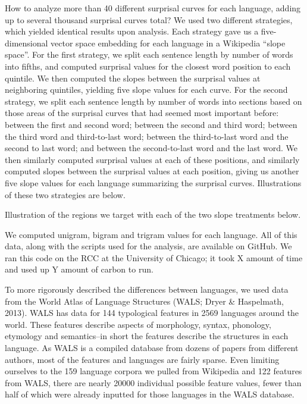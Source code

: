 \documentclass[11pt,]{article}
\begin{document}
How to analyze more than 40 different surprisal curves for each language, adding up to several thousand surprisal curves total? We used two different strategies, which yielded identical results upon analysis. Each strategy gave us a five-dimensional vector space embedding for each language in a Wikipedia ``slope space''. For the first strategy, we split each sentence length by number of words into fifths, and computed surprisal values for the closest word position to each quintile. We then computed the slopes between the surprisal values at neighboring quintiles, yielding five slope values for each curve. For the second strategy, we split each sentence length by number of words into sections based on those areas of the surprisal curves that had seemed most important before: between the first and second word; between the second and third word; between the third word and third-to-last word; between the third-to-last word and the second to last word; and between the second-to-last word and the last word. We then similarly computed surprisal values at each of these positions, and similarly computed slopes between the surprisal values at each position, giving us another five slope values for each language summarizing the surprisal curves. Illustrations of these two strategies are below.

Illustration of the regions we target with each of the two slope treatments below.

We computed unigram, bigram and trigram values for each language. All of this data, along with the scripts used for the analysis, are available on GitHub. We ran this code on the RCC at the University of Chicago; it took X amount of time and used up Y amount of carbon to run.

To more rigorously described the differences between languages, we used data from the World Atlas of Language Structures (WALS; Dryer \& Haspelmath, 2013). WALS has data for 144 typological features in 2569 languages around the world. These features describe aspects of morphology, syntax, phonology, etymology and semantics--in short the features describe the structures in each language. As WALS is a compiled database from dozens of papers from different authors, most of the features and languages are fairly sparse. Even limiting ourselves to the 159 language corpora we pulled from Wikipedia and 122 features from WALS, there are nearly 20000 individual possible feature values, fewer than half of which were already inputted for those languages in the WALS database.
\end{document}
